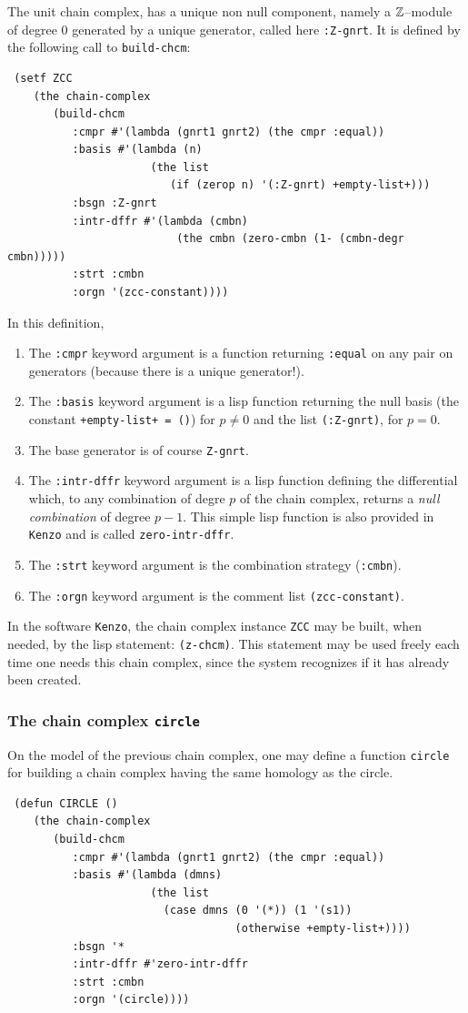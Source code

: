 The unit chain complex, has a unique non null component, 
namely a ${\Bbb Z}$--module of degree $0$ generated by a unique generator, 
called here {\tt :Z-gnrt}. It is defined by the following call to {\tt build-chcm}:
{\footnotesize\begin{verbatim}
 (setf ZCC
    (the chain-complex
       (build-chcm
          :cmpr #'(lambda (gnrt1 gnrt2) (the cmpr :equal))
          :basis #'(lambda (n)
                      (the list
                         (if (zerop n) '(:Z-gnrt) +empty-list+)))
          :bsgn :Z-gnrt
          :intr-dffr #'(lambda (cmbn)
                          (the cmbn (zero-cmbn (1- (cmbn-degr cmbn)))))
          :strt :cmbn
          :orgn '(zcc-constant))))
\end{verbatim}
}
In this definition,
\begin{enumerate}
\item The {\tt :cmpr} keyword   argument is a function  returning {\tt :equal} on any pair
on generators (because there is a unique generator!).
\item The {\tt :basis} keyword argument is a lisp function returning the null basis  
(the constant {\tt +empty-list+ = ()}) for $p \not= 0$ and 
the list {\tt (:Z-gnrt)}, for $p=0$.
\item The base generator is of course {\tt Z-gnrt}.
\item The {\tt :intr-dffr} keyword argument is a lisp function defining the differential  which, 
to any combination of degre $p$
of the chain complex, returns a {\em null combination} of degree $p-1$. This simple lisp function 
is also provided in {\tt Kenzo} and is called {\tt zero-intr-dffr}.
\item The {\tt :strt} keyword argument is the combination strategy ({\tt :cmbn}).
\item The {\tt :orgn} keyword argument is the comment list {\tt (zcc-constant)}.
\end{enumerate}
In the software {\tt Kenzo}, the chain complex instance {\tt ZCC} may be built, when needed, 
by the lisp statement: {\tt (z-chcm)}. This statement may be used freely each time
one needs this chain complex, since the system  recognizes if it has already been
created.

\subsubsection {The chain complex {\tt circle}}

On the model of the previous chain complex, one may define a function {\tt circle} for building a chain complex
having the same homology as the circle.
{\footnotesize\begin{verbatim}
 (defun CIRCLE ()
    (the chain-complex
       (build-chcm
          :cmpr #'(lambda (gnrt1 gnrt2) (the cmpr :equal))
          :basis #'(lambda (dmns)
                      (the list
                        (case dmns (0 '(*)) (1 '(s1))
                                   (otherwise +empty-list+))))
          :bsgn '*
          :intr-dffr #'zero-intr-dffr
          :strt :cmbn
          :orgn '(circle))))
\end{verbatim}
}

